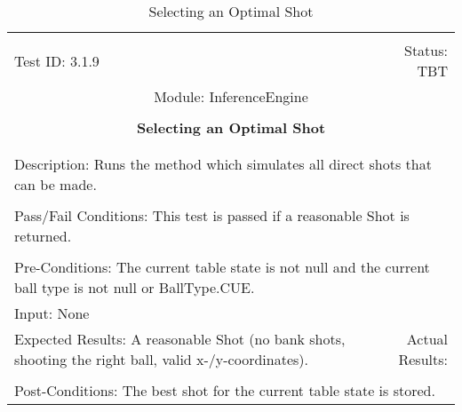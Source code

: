 \documentclass[titlepage]{article}
\begin{document}
\begin{center}%
\begin{table}[h!]
\begin{tabular}{|l r|}\hline&\\[-2mm]
	Test ID: 3.1.9	&Status: TBT\\[-3mm]
	\multicolumn{2}{|c|}{Module: InferenceEngine}\\&\\
	\multicolumn{2}{|c|}{\textbf{\large{Selecting an Optimal Shot}}}\\&\\\hline&\\[-3mm]
	\multicolumn{2}{|p{\textwidth}|}{Description: Runs the method which simulates all direct shots that can be made.}\\[1mm]\hline&\\[-3mm]
	\multicolumn{2}{|p{\textwidth}|}{Pass/Fail Conditions: This test is passed if a reasonable Shot is returned.}\\[1mm]\hline&\\[-3mm]
	\multicolumn{2}{|p{\textwidth}|}{Pre-Conditions: The current table state is not null and the current ball type is not null or BallType.CUE.}\\[4mm]
	\multicolumn{2}{|p{\textwidth}|}{Input: None}\\[2mm]\hline
	\multicolumn{1}{|p{0.49\textwidth}}{Expected Results: A reasonable Shot (no bank shots, shooting the right ball, valid x-/y-coordinates).}	&\multicolumn{1}{|p{0.45\textwidth}|}{Actual Results: }\\\hline&\\[-3mm]
	\multicolumn{2}{|p{\textwidth}|}{Post-Conditions: The best shot for the current table state is stored.}\\\hline
\end{tabular}
\caption{Selecting an Optimal Shot}
\end{table}
\end{center}
\newpage
\end{document}
